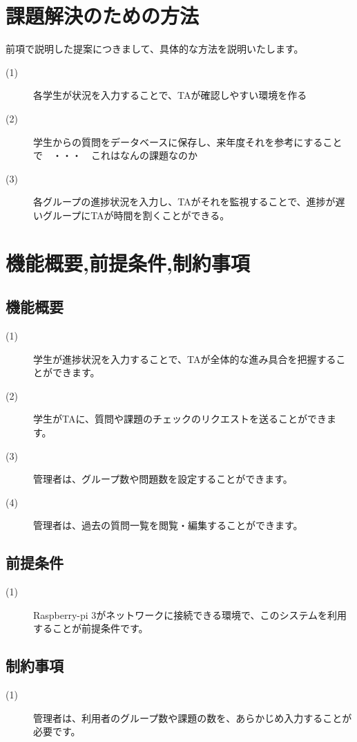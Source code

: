 \documentclass[a4j,titlepage]{ujarticle}
\begin{document}
\section{課題解決のための方法}
前項で説明した提案につきまして、具体的な方法を説明いたします。
\begin{description}
\item[(1)]各学生が状況を入力することで、TAが確認しやすい環境を作る %
\item[(2)]学生からの質問をデータベースに保存し、来年度それを参考にすることで　・・・　これはなんの課題なのか
\item[(3)]各グループの進捗状況を入力し、TAがそれを監視することで、進捗が遅いグループにTAが時間を割くことができる。%

\end{description}
\section{機能概要,前提条件,制約事項}

\subsection{機能概要}
\begin{description}
\item[(1)]学生が進捗状況を入力することで、TAが全体的な進み具合を把握することができます。
\item[(2)]学生がTAに、質問や課題のチェックのリクエストを送ることができます。
\item[(3)]管理者は、グループ数や問題数を設定することができます。
\item[(4)]管理者は、過去の質問一覧を閲覧・編集することができます。　
\end{description}

\subsection{前提条件}
\begin{description}
\item[(1)]Raspberry-pi 3がネットワークに接続できる環境で、このシステムを利用することが前提条件です。
\end{description}

\subsection{制約事項}
\begin{description}
\item[(1)]管理者は、利用者のグループ数や課題の数を、あらかじめ入力することが必要です。
\end{description}
\end{document}

